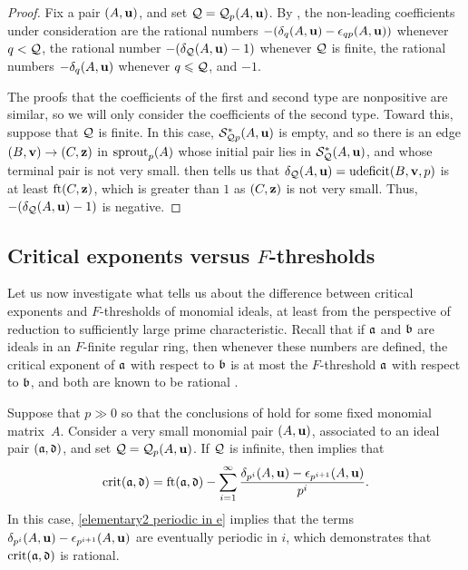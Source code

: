 \documentclass{amsart}
\begin{document}
\begin{proof}
   Fix a pair $(A,\mathbf{u})$, and set $\mathcal{Q}=\mathcal{Q}_p(A,\mathbf{u})$.
   By , the non-leading coefficients under consideration are the rational numbers $-(\delta_{q}(A,\mathbf{u})-\epsilon_{qp}(A,\mathbf{u}))$ whenever $q < \mathcal{Q}$, the rational number $-(\delta_{\mathcal{Q}}(A,\mathbf{u}) - 1)$ whenever $\mathcal{Q}$ is finite, the rational numbers $-\delta_q(A,\mathbf{u})$ whenever $q\leqslant \mathcal{Q}$, and $-1$.

   The proofs that the coefficients of the first and second type are nonpositive are similar, so we will only consider the coefficients of the second type.
   Toward this, suppose that $\mathcal{Q}$ is finite.
   In this case, $\mathcal{S}^{\ast}_{\mathcal{Q} p}(A,\mathbf{u})$ is empty, and so there is an edge $(B,\mathbf{v}) \to (C,\mathbf{z})$ in $\operatorname{sprout}_p(A)$ whose initial pair lies in $\mathcal{S}^{\ast}_{\mathcal{Q}}(A,\mathbf{u})$, and whose terminal pair is not very small.  then tells us that $\delta_{\mathcal{Q}}(A,\mathbf{u}) = \operatorname{udeficit}(B,\mathbf{v},p)$ is at least $\operatorname{ft}(C, \mathbf{z})$, which is greater than $1$ as $(C,\mathbf{z})$ is not very small.
   Thus, $-(\delta_{\mathcal{Q}}(A,\mathbf{u})-1)$ is negative.
\end{proof}

\subsection{Critical exponents versus $F$-thresholds}
\label{crit versus ft: SS}

Let us now investigate what  tells us about the difference between critical exponents and $F$-thresholds of monomial ideals, at least from the perspective of reduction to sufficiently large prime characteristic.
Recall that if $\mathfrak{a}$ and $\mathfrak{b}$ are ideals in an $F$-finite regular ring, then whenever these numbers are defined, the critical exponent of $\mathfrak{a}$ with respect to $\mathfrak{b}$ is at most the $F$-threshold $\mathfrak{a}$ with respect to $\mathfrak{b}$, and both are known to be rational \cite[Corollary~5.8]{hernandez+etal.frobenius_powers}.

Suppose that $p \gg 0$ so that the conclusions of  hold for some fixed monomial matrix~$A$.
Consider a very small monomial pair $(A,\mathbf{u})$, associated to an ideal pair $(\mathfrak{a},\mathfrak{d})$, and set $\mathcal{Q} = \mathcal{Q}_p(A,\mathbf{u})$.
If $\mathcal{Q}$ is infinite, then   implies that
\begin{equation}\label{eq: crit infinite case}
\operatorname{crit}(\mathfrak{a},\mathfrak{d})=\operatorname{ft}(\mathfrak{a}, \mathfrak{d}) - \sum_{i=1}^{\infty} \frac{\delta_{p^i}(A,\mathbf{u})-\epsilon_{p^{i+1}}(A,\mathbf{u})}{p^i}.
\end{equation}
In this case, \eqref{elementary2 periodic in e} implies that the terms $\delta_{p^i}(A,\mathbf{u})-\epsilon_{p^{i+1}}(A,\mathbf{u})$ are eventually periodic in $i$, which demonstrates that $\operatorname{crit}(\mathfrak{a},\mathfrak{d})$ is rational.
\end{document}
